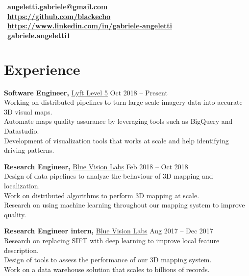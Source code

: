 \documentclass[margin]{res}
\begin{document}
    \address{London, UK  \\ (+44) 7803 056685}
    \begin{resume}
        \section{}
        \faEnvelope~\textbf{angeletti.gabriele@gmail.com} \\[5pt]
        \faGithub~\textbf{\url{https://github.com/blackecho}} \\[5pt]
        \faLinkedin~\textbf{\url{https://www.linkedin.com/in/gabriele-angeletti}} \\[5pt]
        \faSkype~\textbf{gabriele.angeletti1}

        \section{Experience}
            {\bf Software Engineer,} \href{https://www.lyft.com/self-driving-vehicles/}{Lyft Level 5}
            \hfill Oct 2018 -- Present\\
            Working on distributed pipelines to turn large-scale imagery data into accurate 3D visual maps.\\
            Automate maps quality assurance by leveraging tools such as BigQuery and Datastudio.\\
            Development of visualization tools that works at scale and help identifying driving patterns.

            {\bf Research Engineer,} \href{http://www.bluevisionlabs.com}{Blue Vision Labs} \hfill Feb 2018 -- Oct 2018\\
            Design of data pipelines to analyze the behaviour of 3D mapping and localization.\\
            Work on distributed algorithms to perform 3D mapping at scale.\\
            Research on using machine learning throughout our mapping system to improve quality.

            {\bf Research Engineer intern,} \href{http://www.bluevisionlabs.com}{Blue Vision Labs} \hfill Aug 2017 -- Dec 2017\\
            Research on replacing SIFT with deep learning to improve local feature description.\\
	        Design of tools to assess the performance of our 3D mapping system.\\
	        Work on a data warehouse solution that scales to billions of records.


\end{resume}
\end{document}
